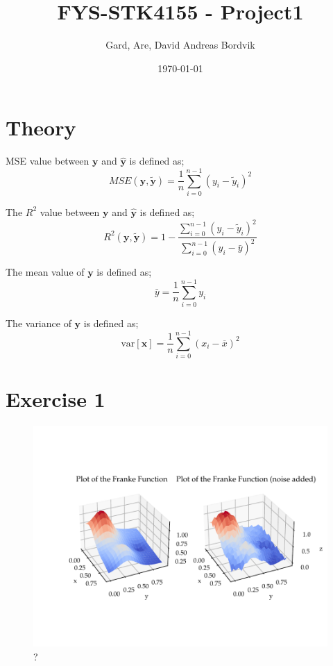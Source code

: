 \documentclass[11pt]{article}
\title{FYS-STK4155 - Project1}
\author{Gard, Are, David Andreas Bordvik}
\date{\today}
\begin{document}
\maketitle
\section*{Theory}
MSE value between $\boldsymbol{y}$ and $\boldsymbol{\hat y}$ is defined as;
\begin{equation}
    MSE(\boldsymbol{y},\boldsymbol{\tilde{y}}) = \frac{1}{n}
    \sum_{i=0}^{n-1}(y_i-\tilde{y}_i)^2
\end{equation}

The $R^2$ value between $\boldsymbol{y}$ and $\boldsymbol{\hat y}$ is defined as;
\begin{equation}
    R^2(\boldsymbol{y}, \tilde{\boldsymbol{y}}) = 1 - \frac{\sum_{i=0}^{n - 1} (y_i - \tilde{y}_i)^2}{\sum_{i=0}^{n - 1} (y_i - \bar{y})^2}
\end{equation}

The mean value of $\boldsymbol{y}$ is defined as;
\begin{equation}
    \bar{y} =  \frac{1}{n} \sum_{i=0}^{n - 1} y_i
\end{equation}

The variance of $\boldsymbol{y}$ is defined as;
\begin{equation}
    \mathrm{var}[\boldsymbol{x}]=\frac{1}{n}\sum_{i=0}^{n-1}(x_i- \overline{x})^2
\end{equation}



\section*{Exercise 1}
\begin{figure}
  \centering
  \includegraphics{figures/franke_function_preview.pdf}
  \caption{?}
  \label{fig: ?}
\end{figure}
\end{document}
